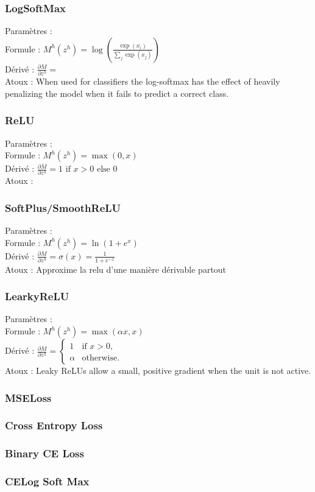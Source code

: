 \documentclass{article}
\theoremstyle{plain}%
\theoremstyle{definition}
\theoremstyle{remark}
\begin{document}
\begin{multicols}{2}
\subsubsection{LogSoftMax}
Paramètres : \\
Formule : $ M^h(z^h) = \log ( \frac{ \exp(x_i) }{ \sum_j \exp(x_j) } ) $ \\
Dérivé : $ \frac{\partial M}{\partial z^h} =  $ \\
Atoux : When used for classifiers the log-softmax has the effect of heavily penalizing the model when it fails to predict a correct class.

\subsubsection{ReLU}
Paramètres : \\
Formule : $ M^h(z^h) = \max (0, x) $ \\
Dérivé : $ \frac{\partial M}{\partial z^h} = 1 \text{ if } x > 0 \text{ else } 0 $ \\
Atoux : 

\subsubsection{SoftPlus/SmoothReLU}
Paramètres : \\
Formule : $ M^h(z^h) = \ln (1 + e^x) $ \\
Dérivé : $ \frac{\partial M}{\partial z^h} = \sigma (x) = \frac{1}{1 + e^{-x}} $ \\
Atoux : Approxime la relu d'une manière dérivable partout

\subsubsection{LearkyReLU}
Paramètres : \\
Formule : $ M^h(z^h) = \max(\alpha x, x) $ \\
Dérivé : $ \frac{\partial M}{\partial z^h} = 
    \begin{cases} 
        1 & \text{if } x>0, \\
        \alpha & \text{otherwise}.
    \end{cases}$ \\
Atoux : Leaky ReLUs allow a small, positive gradient when the unit is not active.

\subsubsection{MSELoss}
\subsubsection{Cross Entropy Loss}
\subsubsection{Binary CE Loss}
\subsubsection{CELog Soft Max}

\end{multicols}
\end{document}
